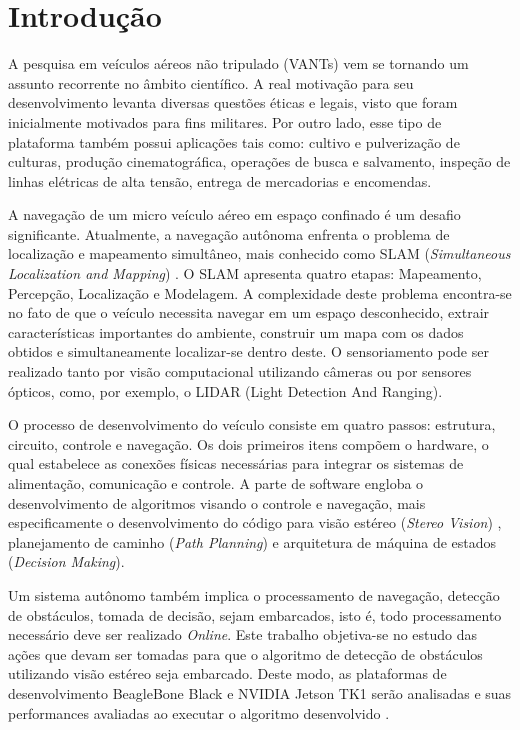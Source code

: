 \chapter{Introdução}
\label{Introducao}

A pesquisa em veículos aéreos não tripulado (VANTs) vem se tornando um assunto recorrente no âmbito científico. A real motivação para seu desenvolvimento levanta diversas questões éticas e legais, visto que foram inicialmente motivados para fins militares. Por outro lado, esse tipo de plataforma também possui aplicações tais como: cultivo e pulverização de culturas, produção cinematográfica, operações de busca e salvamento, inspeção de linhas elétricas de alta tensão, entrega de mercadorias e encomendas.

A navegação de um micro veículo aéreo em espaço confinado é um desafio significante. Atualmente, a navegação autônoma enfrenta o problema de localização e mapeamento simultâneo, mais conhecido como SLAM (\textit{Simultaneous Localization and Mapping}) \cite{Dissanayake2001}. O SLAM apresenta quatro etapas: Mapeamento, Percepção, Localização e Modelagem. A complexidade deste problema encontra-se no fato de que o veículo necessita navegar em um espaço desconhecido, extrair características importantes do ambiente, construir um mapa com os dados obtidos e simultaneamente localizar-se dentro deste. O sensoriamento pode ser realizado tanto por visão computacional utilizando câmeras ou por sensores ópticos, como, por exemplo, o LIDAR (Light Detection And Ranging). 

O processo de desenvolvimento do veículo consiste em quatro passos: estrutura, circuito, controle e navegação. Os dois primeiros itens compõem o hardware, o qual estabelece as conexões físicas necessárias para integrar os sistemas de alimentação, comunicação e controle. A parte de software engloba o desenvolvimento de algoritmos visando o controle e navegação, mais especificamente o desenvolvimento do código para visão estéreo (\textit{Stereo Vision}) \cite{Lemaire2007}, planejamento de caminho (\textit{Path Planning}) e arquitetura de máquina de estados (\textit{Decision Making}).

Um sistema autônomo também implica o processamento de navegação, detecção de obstáculos, tomada de decisão, sejam embarcados, isto é, todo processamento necessário deve ser realizado \textit{Online}. Este trabalho objetiva-se no estudo das ações que devam ser tomadas para que o algoritmo de detecção de obstáculos utilizando visão estéreo seja embarcado. Deste modo, as plataformas de desenvolvimento BeagleBone Black e NVIDIA Jetson TK1 serão analisadas e suas performances avaliadas ao executar o algoritmo desenvolvido \cite{Shah2014}. 


